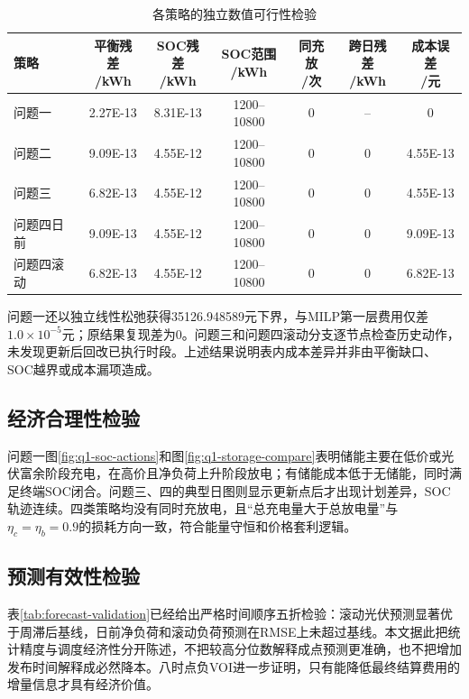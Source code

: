 \documentclass[UTF8,a4paper,12pt,fontset=fandol]{ctexart}
\numberwithin{equation}{section}
\begin{document}
\begingroup
\scriptsize
\setlength{\tabcolsep}{3.2pt}
\begin{table}[htbp]
\centering
\caption{各策略的独立数值可行性检验}\label{tab:numerical-checks}
\begin{tabular}{lcccccc}
\toprule
策略 & \shortstack{平衡残差\\/kWh} & \shortstack{SOC残差\\/kWh} & \shortstack{SOC范围\\/kWh} & \shortstack{同充放\\/次} & \shortstack{跨日残差\\/kWh} & \shortstack{成本误差\\/元}\\
\midrule
问题一 & 2.27E-13 & 8.31E-13 & 1200--10800 & 0 & -- & 0\\
问题二 & 9.09E-13 & 4.55E-12 & 1200--10800 & 0 & 0 & 4.55E-13\\
问题三 & 6.82E-13 & 4.55E-12 & 1200--10800 & 0 & 0 & 4.55E-13\\
问题四日前 & 9.09E-13 & 4.55E-12 & 1200--10800 & 0 & 0 & 9.09E-13\\
问题四滚动 & 6.82E-13 & 4.55E-12 & 1200--10800 & 0 & 0 & 6.82E-13\\
\bottomrule
\end{tabular}
\end{table}
\endgroup

问题一还以独立线性松弛获得35126.948589元下界，与MILP第一层费用仅差$1.0\times10^{-5}$元；原结果复现差为0。问题三和问题四滚动分支逐节点检查历史动作，未发现更新后回改已执行时段。上述结果说明表内成本差异并非由平衡缺口、SOC越界或成本漏项造成。

\subsection{经济合理性检验}

问题一图\ref{fig:q1-soc-actions}和图\ref{fig:q1-storage-compare}表明储能主要在低价或光伏富余阶段充电，在高价且净负荷上升阶段放电；有储能成本低于无储能，同时满足终端SOC闭合。问题三、四的典型日图则显示更新点后才出现计划差异，SOC轨迹连续。四类策略均没有同时充放电，且“总充电量大于总放电量”与$\eta_c=\eta_b=0.9$的损耗方向一致，符合能量守恒和价格套利逻辑。

\subsection{预测有效性检验}

表\ref{tab:forecast-validation}已经给出严格时间顺序五折检验：滚动光伏预测显著优于周滞后基线，日前净负荷和滚动负荷预测在RMSE上未超过基线。本文据此把统计精度与调度经济性分开陈述，不把较高分位数解释成点预测更准确，也不把增加发布时间解释成必然降本。八时点负VOI进一步证明，只有能降低最终结算费用的增量信息才具有经济价值。
\end{document}
